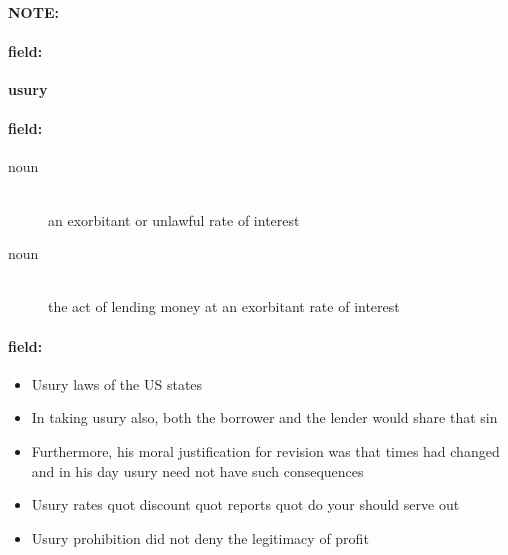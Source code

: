 \documentclass[12pt]{article}
\newenvironment{note}{\paragraph{NOTE:}}{}
\newenvironment{field}{\paragraph{field:}}{}
\begin{document}
\begin{note}
\begin{field}
\textbf{\large usury}
\end{field}


\begin{field}
\begin{description}
\item[noun] \hfill \\ 
an exorbitant or unlawful rate of interest

\item[noun] \hfill \\ 
the act of lending money at an exorbitant rate of interest

\end{description}
\end{field}

\begin{field}
\begin{itemize}
\item Usury laws of the US states
\item In taking usury also, both the borrower and the lender would share that sin
\item Furthermore, his moral justification for revision was that times had changed and in his day usury need not have such consequences
\item Usury rates quot discount quot reports quot do your should serve out
\item Usury prohibition did not deny the legitimacy of profit
\end{itemize}
\end{field}
\end{note}
\end{document}

